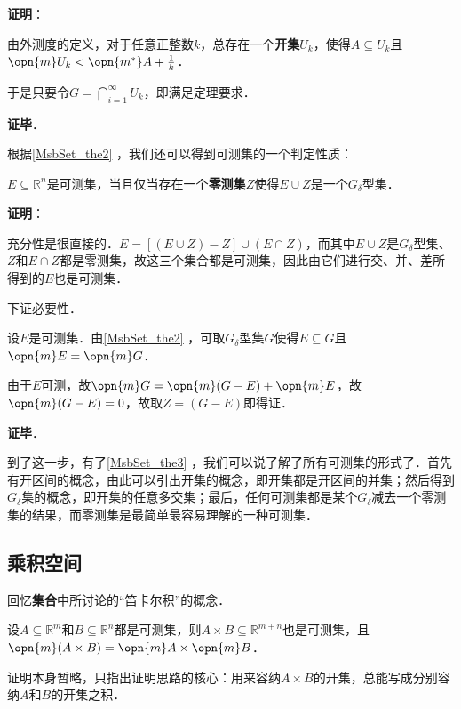\textbf{证明}：

由外测度的定义，对于任意正整数$k$，总存在一个\textbf{开集}$U_k$，使得$A\subseteq U_k$且$\opn{m}U_k<\opn{m^*}A+\frac{1}{k}$．

于是只要令$G=\bigcap_{i=1}^\infty U_k$，即满足定理要求．

\textbf{证毕}．








根据\autoref{MsbSet_the2} ，我们还可以得到可测集的一个判定性质：

\begin{theorem}{}\label{MsbSet_the3}
$E\subseteq \mathbb{R}^n$是可测集，当且仅当存在一个\textbf{零测集}$Z$使得$E\cup Z$是一个$G_\delta$型集．
\end{theorem}

\textbf{证明}：

充分性是很直接的．$E=[(E\cup Z)-Z]\cup(E\cap Z)$，而其中$E\cup Z$是$G_\delta$型集、$Z$和$E\cap Z$都是零测集，故这三个集合都是可测集，因此由它们进行交、并、差所得到的$E$也是可测集．

下证必要性．

设$E$是可测集．由\autoref{MsbSet_the2} ，可取$G_\delta$型集$G$使得$E\subseteq G$且$\opn{m}E=\opn{m}G$．

由于$E$可测，故$\opn{m}G=\opn{m}(G-E)+\opn{m}E$，故$\opn{m}(G-E)=0$，故取$Z=(G-E)$即得证．

\textbf{证毕}．

到了这一步，有了\autoref{MsbSet_the3} ，我们可以说了解了所有可测集的形式了．首先有开区间的概念，由此可以引出开集的概念，即开集都是开区间的并集；然后得到$G_\delta$集的概念，即开集的任意多交集；最后，任何可测集都是某个$G_\delta$减去一个零测集的结果，而零测集是最简单最容易理解的一种可测集．


\subsection{乘积空间}

回忆\textbf{集合}中所讨论的“笛卡尔积”的概念．

\begin{theorem}{}
设$A\subseteq\mathbb{R}^m$和$B\subseteq\mathbb{R}^n$都是可测集，则$A\times B \subseteq \mathbb{R}^{m+n}$也是可测集，且$\opn{m}(A\times B)=\opn{m}A\times \opn{m}B$．
\end{theorem}

证明本身暂略，只指出证明思路的核心：用来容纳$A\times B$的开集，总能写成分别容纳$A$和$B$的开集之积．

